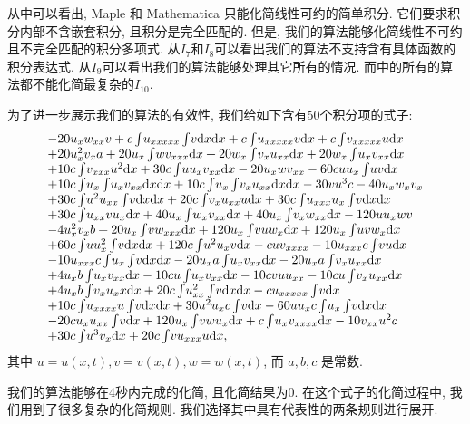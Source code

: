 从中可以看出, Maple 和 Mathematica 只能化简线性可约的简单积分. 它们要求积分内部不含嵌套积分, 且积分是完全匹配的. 但是, 我们的算法能够化简线性不可约且不完全匹配的积分多项式. 从$I_7$和$I_8$可以看出我们的算法不支持含有具体函数的积分表达式. 从$I_9$可以看出我们的算法能够处理其它所有的情况. 而中的所有的算法都不能化简最复杂的$I_{10}$. 

为了进一步展示我们的算法的有效性, 我们给如下含有50个积分项的式子:
\begin{equation}
\def\arraystretch{1.0}
\begin{array}{l}
-20u_xw_{xx}v
+c\ii{u_{xxxxx}\ii{v}}
+c\ii{u_{xxxxx}v}
+c\ii{v_{xxxxx}u}\\%
+20u_x^2v_xa
+20u_x\ii{wv_{xxx}}
+20w_x\ii{v_xu_{xx}}
+20w_x\ii{u_xv_{xx}}\\%
+10c\ii{v_{xxx}u^2}
+30c\ii{uu_xv_{xx}}
-20u_xwv_{xx}
-60cuu_x\ii{uv}\\%
+10c\ii{u_x\ii{u_xv_{xx}}}
+10c\ii{u_x\ii{v_xu_{xx}}}
-30vu^3c
-40u_xw_xv_x\\%
+30c\ii{u^2u_{xx}\ii{v}}
+20c\ii{v_xu_{xx}u}
+30c\ii{u_{xxx}u_x\ii{v}}\\%
+30c\ii{u_{xx}vu_x}
+40u_x\ii{w_xv_{xx}}
+40u_x\ii{v_xw_{xx}}
-120uu_xwv\\%
-4u_x^2v_xb
+20u_x\ii{vw_{xxx}}
+120u_x\ii{vuw_x}
+120u_x\ii{uvw_x}\\%
+60c\ii{uu_x^2\ii{v}}
+120c\ii{u^2u_xv}
-cuv_{xxxx}
-10u_{xxx}c\ii{vu}\\%
-10u_{xxx}c\ii{u_x\ii{v}}
-20u_xa\ii{u_xv_{xx}}
-20u_xa\ii{v_xu_{xx}}\\%
+4u_xb\ii{u_xv_{xx}}
-10cu\ii{u_xv_{xx}}
-10c v u u_{xx}
-10cu\ii{v_xu_{xx}}\\%
+4u_xb\ii{v_xu_xx}
+20c\ii{u_{xx}^2\ii{v}}
-cu_{xxxxx}\ii{v}\\%
+10c\ii{u_{xxxx}u\ii{v}}
+30u^2u_xc\ii{v}
-60uu_xc\ii{u_x\ii{v}}\\%
-20cu_xu_{xx}\ii{v}
+120u_x\ii{vwu_x}
+c\ii{u_xv_{xxxx}}
-10v_{xx}u^2c\\%
+30c\ii{u^3v_x}
+20c\ii{vu_{xxx}u},\\%
\end{array}
\label{big50}
\end{equation}
其中 $u=u(x,t),v=v(x,t),w=w(x,t)$, 而 $a,b,c$ 是常数. 

我们的算法能够在4秒内完成的化简, 且化简结果为0. 在这个式子的化简过程中, 我们用到了很多复杂的化简规则. 我们选择其中具有代表性的两条规则进行展开. 

